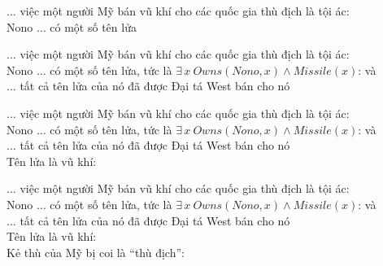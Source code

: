 \documentclass{article}
\begin{document}
\begin{huge}

$\ldots$ việc một người Mỹ bán vũ khí cho các quốc gia thù địch là tội ác:\al
  \\
Nono $\ldots$ có một số tên lửa


$\ldots$ việc một người Mỹ bán vũ khí cho các quốc gia thù địch là tội ác:\al
  \\
Nono $\ldots$ có một số tên lửa, tức là $\exists\,x\ Owns(Nono,x)\land Missile(x)$:\al
   và \\
$\ldots$ tất cả tên lửa của nó đã được Đại tá West bán cho nó


$\ldots$ việc một người Mỹ bán vũ khí cho các quốc gia thù địch là tội ác:\al
  \\
Nono $\ldots$ có một số tên lửa, tức là $\exists\,x\ Owns(Nono,x)\land Missile(x)$:\al
   và \\
$\ldots$ tất cả tên lửa của nó đã được Đại tá West bán cho nó\al
  \\
Tên lửa là vũ khí:


$\ldots$ việc một người Mỹ bán vũ khí cho các quốc gia thù địch là tội ác:\al
  \\
Nono $\ldots$ có một số tên lửa, tức là $\exists\,x\ Owns(Nono,x)\land Missile(x)$:\al
   và \\
$\ldots$ tất cả tên lửa của nó đã được Đại tá West bán cho nó\al
  \\
Tên lửa là vũ khí:\al
  \\
Kẻ thù của Mỹ bị coi là “thù địch”:


\end{huge}
\end{document}
